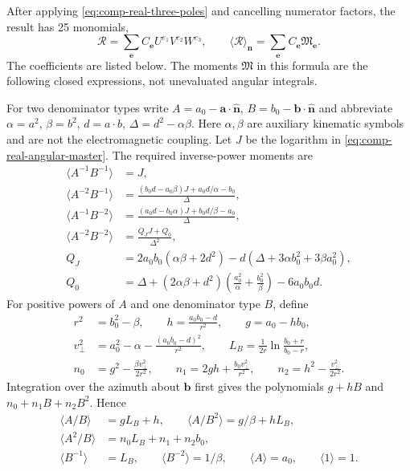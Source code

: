 After applying \eqref{eq:comp-real-three-poles} and cancelling
numerator factors, the result has 25 monomials,
\begin{equation}
 \mathcal R=\sum_{\bm e}C_{\bm e}U^{e_1}V^{e_2}W^{e_3},\qquad
 \boxed{\langle\mathcal R\rangle_{\bm n}
          =\sum_{\bm e}C_{\bm e}\mathfrak M_{\bm e}.}
 \label{eq:comp-real-angle-completed}
\end{equation}
The coefficients are listed below. The moments $\mathfrak M$ in
this formula are the following closed expressions, not unevaluated
angular integrals.

For two denominator types write $A=a_0-\bm a\cdot\widehat{\bm n}$,
$B=b_0-\bm b\cdot\widehat{\bm n}$ and abbreviate
$\alpha=a^2$, $\beta=b^2$, $d=a\cdot b$,
$\Delta=d^2-\alpha\beta$. Here $\alpha,\beta$ are auxiliary
kinematic symbols and are not the electromagnetic coupling.
Let $J$ be the logarithm in \eqref{eq:comp-real-angular-master}.
The required inverse-power moments are
\begin{align}
 \langle A^{-1}B^{-1}\rangle&=J,\\
 \langle A^{-2}B^{-1}\rangle
 &=\frac{(b_0d-a_0\beta)J+a_0d/\alpha-b_0}{\Delta},\\
 \langle A^{-1}B^{-2}\rangle
 &=\frac{(a_0d-b_0\alpha)J+b_0d/\beta-a_0}{\Delta},\\
 \langle A^{-2}B^{-2}\rangle
 &=\frac{Q_JJ+Q_0}{\Delta^2},\\
 Q_J&=2a_0b_0(\alpha\beta+2d^2)
       -d(\Delta+3\alpha b_0^2+3\beta a_0^2),\\
 Q_0&=\Delta+(2\alpha\beta+d^2)
          \left(\frac{a_0^2}{\alpha}+\frac{b_0^2}{\beta}\right)
          -6a_0b_0d.
\end{align}
For positive powers of $A$ and one denominator type $B$, define
\begin{align}
 r^2&=b_0^2-\beta,\qquad
 h=\frac{a_0b_0-d}{r^2},\qquad g=a_0-hb_0,\\
 v_\perp^2&=a_0^2-\alpha-\frac{(a_0b_0-d)^2}{r^2},\qquad
 L_B=\frac1{2r}\ln\frac{b_0+r}{b_0-r},\\
 n_0&=g^2-\frac{\beta v_\perp^2}{2r^2},\qquad
 n_1=2gh+\frac{b_0v_\perp^2}{r^2},\qquad
 n_2=h^2-\frac{v_\perp^2}{2r^2}.
\end{align}
Integration over the azimuth about $\bm b$ first gives the
polynomials $g+hB$ and $n_0+n_1B+n_2B^2$. Hence
\begin{align}
 \langle A/B\rangle&=gL_B+h,\qquad
 \langle A/B^2\rangle=g/\beta+hL_B,\\
 \langle A^2/B\rangle&=n_0L_B+n_1+n_2b_0,\\
 \langle B^{-1}\rangle&=L_B,\qquad
 \langle B^{-2}\rangle=1/\beta,\qquad
 \langle A\rangle=a_0,\qquad\langle1\rangle=1.
\end{align}
